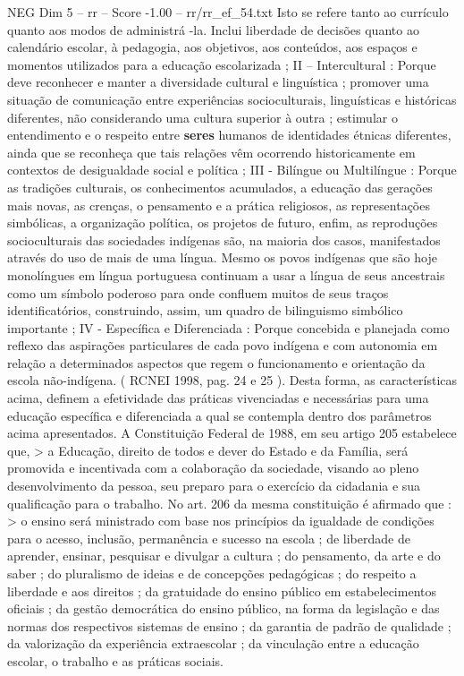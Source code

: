 \begin{textsample}{NEG Dim 5 – rr – Score -1.00 – rr/rr\_ef\_54.txt}
Isto se refere tanto ao currículo quanto aos modos de administrá -la.
Inclui liberdade de decisões quanto ao calendário escolar, à pedagogia, aos objetivos, aos conteúdos, aos espaços e momentos utilizados para a educação escolarizada ; II – Intercultural : Porque deve reconhecer e manter a diversidade cultural e linguística ; promover uma situação de comunicação entre experiências socioculturais, linguísticas e históricas diferentes, não considerando uma cultura superior à outra ; estimular o entendimento e o respeito entre \textbf{seres} humanos de identidades étnicas diferentes, ainda que se reconheça que tais relações vêm ocorrendo historicamente em contextos de desigualdade social e política ; III - Bilíngue ou Multilíngue : Porque as tradições culturais, os conhecimentos acumulados, a educação das gerações mais novas, as crenças, o pensamento e a prática religiosos, as representações simbólicas, a organização política, os projetos de futuro, enfim, as reproduções socioculturais das sociedades indígenas são, na maioria dos casos, manifestados através do uso de mais de uma língua.
Mesmo os povos indígenas que são hoje monolíngues em língua portuguesa continuam a usar a língua de seus ancestrais como um símbolo poderoso para onde confluem muitos de seus traços identificatórios, construindo, assim, um quadro de bilinguismo simbólico importante ; IV - Específica e Diferenciada : Porque concebida e planejada como reflexo das aspirações particulares de cada povo indígena e com autonomia em relação a determinados aspectos que regem o funcionamento e orientação da escola não-indígena. ( RCNEI 1998, pag. 24 e 25 ).
Desta forma, as características acima, definem a efetividade das práticas vivenciadas e necessárias para uma educação específica e diferenciada a qual se contempla dentro dos parâmetros acima apresentados.
A Constituição Federal de 1988, em seu artigo 205 estabelece que, > a Educação, direito de todos e dever do Estado e da Família, será promovida e incentivada com a colaboração da sociedade, visando ao pleno desenvolvimento da pessoa, seu preparo para o exercício da cidadania e sua qualificação para o trabalho.
No art. 206 da mesma constituição é afirmado que : > o ensino será ministrado com base nos princípios da igualdade de condições para o acesso, inclusão, permanência e sucesso na escola ; de liberdade de aprender, ensinar, pesquisar e divulgar a cultura ; do pensamento, da arte e do saber ; do pluralismo de ideias e de concepções pedagógicas ; do respeito a liberdade e aos direitos ; da gratuidade do ensino público em estabelecimentos oficiais ; da gestão democrática do ensino público, na forma da legislação e das normas dos respectivos sistemas de ensino ; da garantia de padrão de qualidade ; da valorização da experiência extraescolar ; da vinculação entre a educação escolar, o trabalho e as práticas sociais.

\end{textsample}
